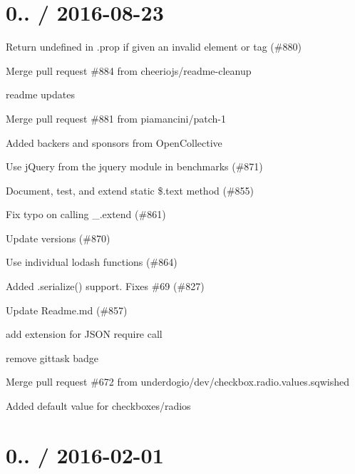 \section*{0.. / 2016-\/08-\/23 }


\begin{DoxyItemize}
\item Return undefined in .prop if given an invalid element or tag (\#880)
\item Merge pull request \#884 from cheeriojs/readme-\/cleanup
\item readme updates
\item Merge pull request \#881 from piamancini/patch-\/1
\item Added backers and sponsors from Open\+Collective
\item Use j\+Query from the jquery module in benchmarks (\#871)
\item Document, test, and extend static {\ttfamily \$.text} method (\#855)
\item Fix typo on calling \+\_\+.\+extend (\#861)
\item Update versions (\#870)
\item Use individual lodash functions (\#864)
\item Added {\ttfamily .serialize()} support. Fixes \#69 (\#827)
\item Update Readme.\+md (\#857)
\item add extension for J\+S\+ON require call
\item remove gittask badge
\item Merge pull request \#672 from underdogio/dev/checkbox.\+radio.\+values.\+sqwished
\item Added default value for checkboxes/radios
\end{DoxyItemize}

\section*{0.. / 2016-\/02-\/01 }


